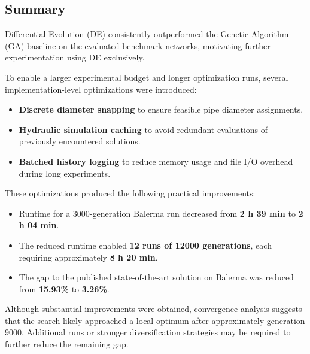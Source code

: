 \documentclass[12pt, a4paper]{article}
\begin{document}
\subsection{Summary}

Differential Evolution (DE) consistently outperformed the Genetic Algorithm (GA) baseline on the evaluated benchmark networks, motivating further experimentation using DE exclusively.

To enable a larger experimental budget and longer optimization runs, several implementation-level optimizations were introduced:

\begin{itemize}
    \item \textbf{Discrete diameter snapping} to ensure feasible pipe diameter assignments.
    \item \textbf{Hydraulic simulation caching} to avoid redundant evaluations of previously encountered solutions.
    \item \textbf{Batched history logging} to reduce memory usage and file I/O overhead during long experiments.
\end{itemize}

These optimizations produced the following practical improvements:

\begin{itemize}
    \item Runtime for a 3000-generation Balerma run decreased from \textbf{2 h 39 min} to \textbf{2 h 04 min}.
    \item The reduced runtime enabled \textbf{12 runs of 12000 generations}, each requiring approximately \textbf{8 h 20 min}.
    \item The gap to the published state-of-the-art solution on Balerma was reduced from \textbf{15.93\%} to \textbf{3.26\%}.
\end{itemize}

Although substantial improvements were obtained, convergence analysis suggests that the search likely approached a local optimum after approximately generation 9000. Additional runs or stronger diversification strategies may be required to further reduce the remaining gap.
\end{document}

